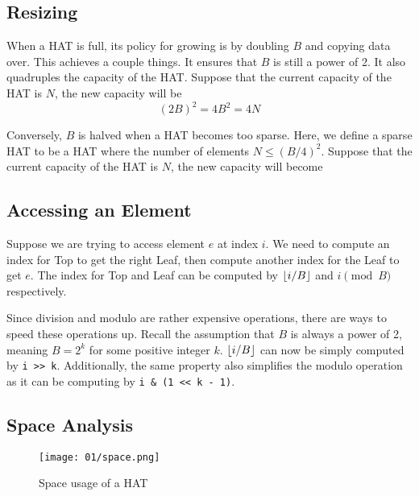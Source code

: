 \subsection*{Resizing}

\begingroup

When a HAT is full, its policy for growing is by doubling $B$ and copying data over. This achieves
a couple things. It ensures that $B$ is still a power of 2. It also quadruples the capacity of the
HAT. Suppose that the current capacity of the HAT is $N$, the new capacity will be
\[(2B)^2 = 4B^2 = 4N \]

Conversely, $B$ is halved when a HAT becomes too sparse. Here, we define a sparse HAT to be a HAT 
where the number of elements $N \leq (B/4)^2$. Suppose that the current capacity of the HAT is $N$,
the new capacity will become 

\endgroup

\subsection*{Accessing an Element}

\begingroup

Suppose we are trying to access element $e$ at index $i$. We need to compute an index for Top to get
the right Leaf, then compute another index for the Leaf to get $e$. The index for Top and Leaf can
be computed by ${\left\lfloor i/B \right\rfloor}$ and $i \pmod B$ respectively.

Since division and modulo are rather expensive operations, there are ways to speed these operations
up. Recall the assumption that $B$ is always a power of 2, meaning $B = 2^k$ for some
positive integer $k$. ${\left\lfloor i/B \right\rfloor}$ can now be simply computed by \texttt{i >> k}. 
Additionally, the same property also simplifies the modulo operation as it can be computing by
\texttt{i & (1 << k - 1)}.

\endgroup

\subsection*{Space Analysis}

\begingroup

\begin{wrapfigure}{r}{0.4\textwidth}
	\vspace*{-10pt}
	\centering
	\texttt{[image: 01/space.png]}
	\caption{Space usage of a HAT}
	\vspace*{-30pt}
\end{wrapfigure}

